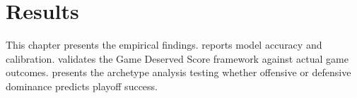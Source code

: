 \chapter{Results}
\label{ch:results}

This chapter presents the empirical findings.  reports \xscore{} model accuracy and calibration.  validates the Game Deserved Score framework against actual game outcomes.  presents the archetype analysis testing whether offensive or defensive dominance predicts playoff success.




